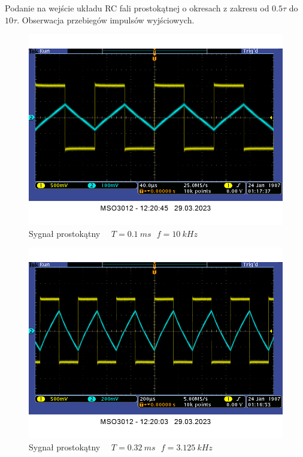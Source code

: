 \documentclass[14pt, table]{extarticle}
\begin{document}
\newpage
Podanie na wejście układu RC fali prostokątnej o okresach z zakresu od $0.5 \tau$ do $10 \tau$. Obserwacja przebiegów impulsów wyjściowych.

\begin{figure}[H]
\includegraphics[scale=0.65]{RC-square-0_1ms}
\centering
\captionsetup{labelformat=empty}
\caption{Sygnał prostokątny \ \ $T = 0.1 \ ms \ \ \ f = 10 \ kHz$}
\end{figure}

\begin{figure}[H]
\includegraphics[scale=0.65]{RC-square-0_32ms}
\centering
\captionsetup{labelformat=empty}
\caption{Sygnał prostokątny \ \ $T = 0.32 \ ms \ \ \ f = 3.125 \ kHz$}
\end{figure}
\end{document}
